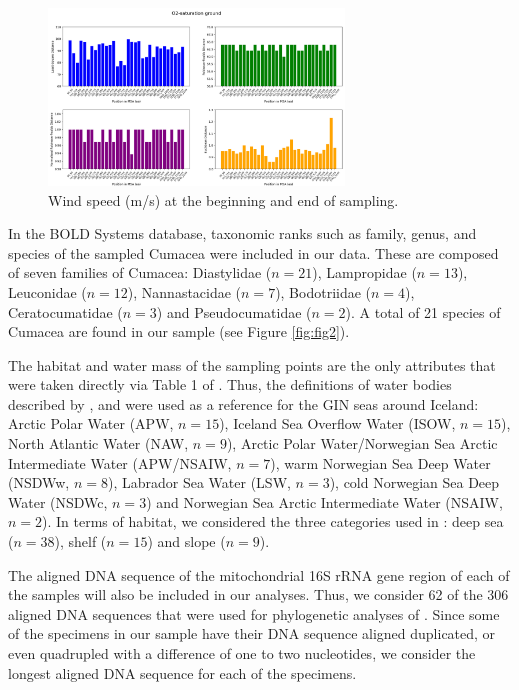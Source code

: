 \begin{figure}[]
    \centering
    \includegraphics[width=0.7\textwidth]{figure6.png}
    \caption{Wind speed (m/s) at the beginning and end of sampling. \label{fig:fig6}}
\end{figure}

In the BOLD Systems database, taxonomic ranks such as family, genus, and species of the sampled Cumacea were included in our data. These are composed of seven families of Cumacea: Diastylidae (\( n=21 \)), Lampropidae (\( n=13 \)), Leuconidae (\( n=12 \)), Nannastacidae (\( n=7 \)), Bodotriidae (\( n=4 \)), Ceratocumatidae (\( n=3 \)) and Pseudocumatidae (\( n=2 \)). A total of 21 species of Cumacea are found in our sample (see Figure \ref{fig:fig2}).

The habitat and water mass of the sampling points are the only attributes that were taken directly via Table 1 of \cite{uhlir_adding_2021}. Thus, the definitions of water bodies described by \cite{hansen_north_2000}, \cite{brix_distribution_2010} and \cite{ostmann_marine_2014} were used as a reference for the GIN seas around Iceland: Arctic Polar Water (APW, \( n=15 \)), Iceland Sea Overflow Water (ISOW, \( n=15 \)), North Atlantic Water (NAW, \( n=9 \)), Arctic Polar Water/Norwegian Sea Arctic Intermediate Water (APW/NSAIW, \( n=7 \)), warm Norwegian Sea Deep Water (NSDWw, \( n=8 \)), Labrador Sea Water (LSW, \( n=3 \)), cold Norwegian Sea Deep Water (NSDWc, \( n=3 \)) and Norwegian Sea Arctic Intermediate Water (NSAIW, \( n=2 \)). In terms of habitat, we considered the three categories used in \cite{uhlir_adding_2021}: deep sea (\( n=38 \)), shelf (\( n=15 \)) and slope (\( n=9 \)).

The aligned DNA sequence of the mitochondrial 16S rRNA gene region of each of the samples will also be included in our analyses. Thus, we consider 62 of the 306 aligned DNA sequences that were used for phylogenetic analyses of \cite{uhlir_adding_2021}. Since some of the specimens in our sample have their DNA sequence aligned duplicated, or even quadrupled with a difference of one to two nucleotides, we consider the longest aligned DNA sequence for each of the specimens.

